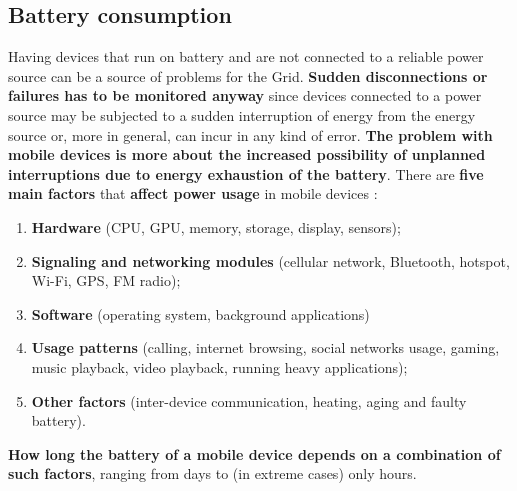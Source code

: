 \subsection{Battery consumption}
Having devices that run on battery and are not connected to a reliable power source can be a source of problems for the Grid. \textbf{Sudden disconnections or failures has to be monitored anyway} since devices connected to a power source may be subjected to a sudden interruption of energy from the energy source or, more in general, can incur in any kind of error. \textbf{The problem with mobile devices is more about the increased possibility of unplanned interruptions due to energy exhaustion of the battery}.
There are \textbf{five main factors} that \textbf{affect power usage} in mobile devices \cite{mobile_power_consumption}:
\begin{enumerate}
    \item \textbf{Hardware} (CPU, GPU, memory, storage, display, sensors);
    \item \textbf{Signaling and networking modules} (cellular network, Bluetooth, hotspot, Wi-Fi, GPS, FM radio);
    \item \textbf{Software} (operating system, background applications)
    \item \textbf{Usage patterns} (calling, internet browsing, social networks usage, gaming, music playback, video playback, running heavy applications);
    \item \textbf{Other factors} (inter-device communication, heating, aging and faulty battery).
\end{enumerate}
\textbf{How long the battery of a mobile device depends on a combination of such factors}, ranging from days to (in extreme cases) only hours.

